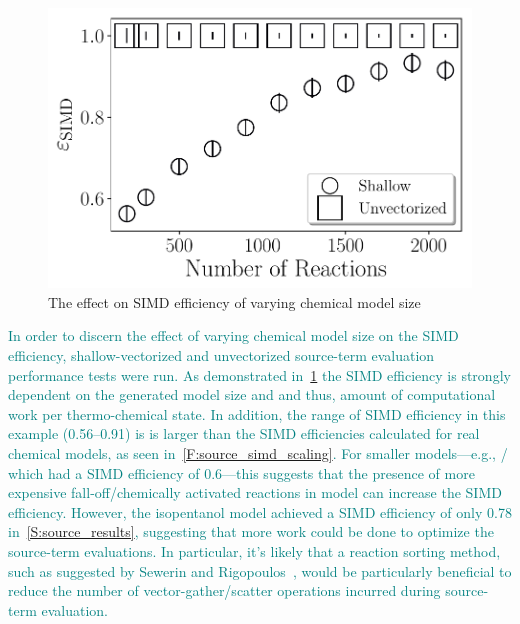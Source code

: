 \documentclass[12pt,number,sort&compress,preprint]{elsarticle}
\newcommand{\add}[1]{{\sloppy\textcolor{teal}{#1}}}  %
\begin{document}
\begin{figure}[htbp]
\centering
\includegraphics[width=0.5\linewidth]{simd_efficiency_scaling}
\caption{The effect on SIMD efficiency of varying chemical model size}
\label{F:simd_vs_rxns}
\end{figure}

\add{In order to discern the effect of varying chemical model size on the SIMD efficiency, shallow-vectorized and unvectorized source-term evaluation performance tests were run.}
\add{As demonstrated in~\cref{F:simd_vs_rxns} the SIMD efficiency is strongly dependent on the generated model size and and thus, amount of computational work per thermo-chemical state.}
\add{In addition, the range of SIMD efficiency in this example (\numrange{0.56}{0.91}) is is larger than the SIMD efficiencies calculated for real chemical models, as seen in~\cref{F:source_simd_scaling}.}
\add{For smaller models---e.g., \slash{} which had a SIMD efficiency of \num{0.6}---this suggests that the presence of more expensive fall-off\slash chemically activated reactions in model can increase the SIMD efficiency.}
\add{However, the isopentanol model achieved a SIMD efficiency of only \num{0.78} in~\cref{S:source_results}, suggesting that more work could be done to optimize the source-term evaluations.}
\add{In particular, it's likely that a reaction sorting method, such as suggested by Sewerin and Rigopoulos~\cite{Sewerin20151375}, would be particularly beneficial to reduce the number of vector-gather\slash scatter operations incurred during source-term evaluation.}

\pagebreak

\end{document}
